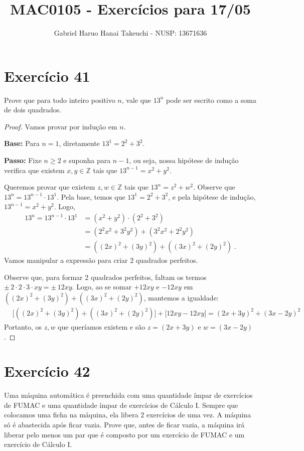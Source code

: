 \documentclass{article}
\author{Gabriel Haruo Hanai Takeuchi - NUSP: 13671636}
\title{MAC0105 - Exercícios para 17/05}
\date{}
\newcommand{\base}{\textbf{Base: }}
\newcommand{\passo}{\textbf{Passo: }}
\begin{document}
\maketitle

\section*{Exercício 41}
Prove que para todo inteiro positivo $n$, vale que $13^n$ pode ser escrito como a soma de dois quadrados.

\begin{proof}
Vamos provar por indução em $n$.

\base Para $n=1$, diretamente $13^1 = 2^2 + 3^2$.

\passo Fixe $n \geq 2$ e suponha para $n-1$, ou seja, nossa hipótese de indução verifica que existem $x,y \in \mathbb{Z}$ tais que $13^{n-1} = x^2 + y^2$.

Queremos provar que existem $z,w \in \mathbb{Z}$ tais que $13^n = z^2 + w^2$.
Observe que $13^n = 13^{n-1} \cdot 13^1$.
Pela base, temos que $13^1 = 2^2 + 3^2$, e pela hipótese de indução, $13^{n-1} = x^2 + y^2$.
Logo,
\begin{align*}
  13^n = 13^{n-1} \cdot 13^1 &= (x^2 + y^2) \cdot (2^2 + 3^2) \\
  &= (2^2 x^2 + 3^2 y^2) + (3^2 x^2 + 2^2 y^2) \\
  &= ((2x)^2 + (3y)^2) + ((3x)^2 + (2y)^2) \; .
\end{align*}
Vamos manipular a expressão para criar 2 quadrados perfeitos.

Observe que, para formar 2 quadrados perfeitos, faltam os termos $\pm \, 2 \cdot 2 \cdot 3 \cdot xy = \pm \, 12xy$.
Logo, ao se somar $+ 12xy$ e $- 12xy$ em $((2x)^2 + (3y)^2) + ((3x)^2 + (2y)^2)$, mantemos a igualdade:
\begin{align*}
  &\big[ ((2x)^2 + (3y)^2) + ((3x)^2 + (2y)^2) \big] + \big[ 12xy - 12xy \big] = (2x + 3y)^2 + (3x - 2y)^2
\end{align*}
Portanto, os $z,w$ que queríamos existem e são $z = (2x + 3y)$ e $w = (3x - 2y)$.

\end{proof}

\section*{Exercício 42}
Uma máquina automática é preenchida com uma quantidade ímpar de exercícios de FUMAC e uma quantidade ímpar de exercícios de Cálculo I.
Sempre que colocamos uma ficha na máquina, ela libera 2 exercícios de uma vez.
A máquina só é abastecida após ficar vazia.
Prove que, antes de ficar vazia, a máquina irá liberar pelo menos um par que é composto por um exercício de FUMAC e um exercício de Cálculo I.
\end{document}

